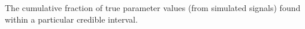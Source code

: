 \label{fig:pp_extra}
The cumulative fraction of true parameter values (from simulated signals) found within
a particular credible interval.
